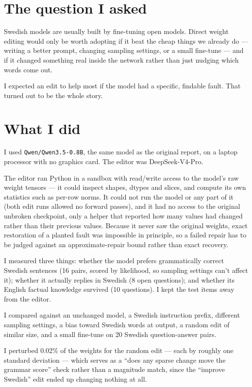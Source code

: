\documentclass[11pt]{article}
\begin{document}
\section{The question I asked}

Swedish models are usually built by fine-tuning open models. Direct weight editing would
only be worth adopting if it beat the cheap things we already do --- writing a better
prompt, changing sampling settings, or a small fine-tune --- and if it changed something
real inside the network rather than just nudging which words come out.

I expected an edit to help most if the model had a specific, findable fault. That turned out
to be the whole story.

\section{What I did}

I used \texttt{Qwen/Qwen3.5-0.8B}, the same model as the original report, on a laptop
processor with no graphics card. The editor was DeepSeek-V4-Pro.

The editor ran Python in a sandbox with read/write access to the model's raw weight tensors
--- it could inspect shapes, dtypes and slices, and compute its own statistics such as
per-row norms. It could not run the model or any part of it (both edit runs allowed no
forward passes), and it had no access to the original unbroken checkpoint, only a helper
that reported how many values had changed rather than their previous values. Because it
never saw the original weights, exact restoration of a planted fault was impossible in
principle, so a failed repair has to be judged against an approximate-repair bound rather
than exact recovery.

I measured three things: whether the model prefers grammatically correct Swedish sentences
(16 pairs, scored by likelihood, so sampling settings can't affect it); whether it actually
replies in Swedish (8 open questions); and whether its English factual knowledge survived
(10 questions). I kept the test items away from the editor.

I compared against an unchanged model, a Swedish instruction prefix, different sampling
settings, a bias toward Swedish words at output, a random edit of similar size, and a small
fine-tune on 20 Swedish question-answer pairs.

I perturbed 0.02\% of the weights for the random edit --- each by roughly one standard
deviation --- which serves as a ``does any sparse change move the grammar score'' check
rather than a magnitude match, since the ``improve Swedish'' edit ended up changing nothing
at all.
\end{document}
